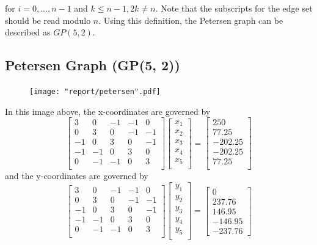 \documentclass[11pt]{report}
\begin{document}
for $i = 0, ..., n - 1$ and $k \leq n - 1, 2k \neq n$. Note that the subscripts for the edge set should be read modulo $n$. Using this definition, the Petersen graph can be described as $GP(5, 2)$.

\pagebreak

\subsection{Petersen Graph (GP(5, 2))}
\begin{figure}[H]
    \centering
    \texttt{[image: "report/petersen".pdf]}
\end{figure}

In this image above, the x-coordinates are governed by
\[
\begin{bmatrix}
3  & 0  & -1 & -1 &  0 \\
0  & 3  &  0 & -1 & -1 \\
-1 & 0  &  3 & 0 & -1 \\
-1 & -1 &  0 & 3 & 0 \\
0  & -1 & -1 & 0 & 3 \\
\end{bmatrix}
\begin{bmatrix}
x_1 \\
x_2 \\
x_3 \\
x_4 \\
x_5 \\
\end{bmatrix}  =
\begin{bmatrix}
250 \\
77.25 \\
-202.25 \\
-202.25 \\ 
77.25 \\
\end{bmatrix}
\]
and the y-coordinates are governed by
\[
\begin{bmatrix}
3  & 0  & -1 & -1 &  0 \\
0  & 3  &  0 & -1 & -1 \\
-1 & 0  &  3 & 0 & -1 \\
-1 & -1 &  0 & 3 & 0 \\
0  & -1 & -1 & 0 & 3 \\
\end{bmatrix}
\begin{bmatrix}
y_1 \\
y_2 \\
y_3 \\
y_4 \\
y_5 \\
\end{bmatrix}  =
\begin{bmatrix}
0 \\
237.76 \\
146.95 \\
-146.95 \\
-237.76
\end{bmatrix}
\]
\end{document}
